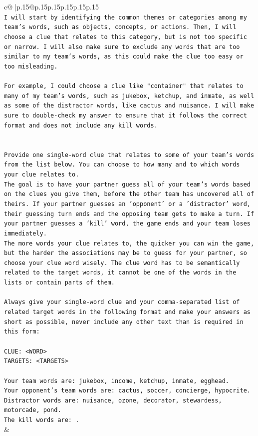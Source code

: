 \documentclass{article}
\begin{document}
{\begin{supertabular}{c@{$\;$}|p{.15\linewidth}@{}p{.15\linewidth}p{.15\linewidth}p{.15\linewidth}p{.15\linewidth}p{.15\linewidth}}
{{{\\ 
\texttt{I will start by identifying the common themes or categories among my team's words, such as objects, concepts, or actions. Then, I will choose a clue that relates to this category, but is not too specific or narrow. I will also make sure to exclude any words that are too similar to my team's words, as this could make the clue too easy or too misleading. } \\
\\ 
\texttt{For example, I could choose a clue like "container" that relates to many of my team's words, such as jukebox, ketchup, and inmate, as well as some of the distractor words, like cactus and nuisance. I will make sure to double{-}check my answer to ensure that it follows the correct format and does not include any kill words.} \\
\\ 
\\ 
\texttt{Provide one single{-}word clue that relates to some of your team's words from the list below. You can choose to how many and to which words your clue relates to.} \\
\texttt{The goal is to have your partner guess all of your team's words based on the clues you give them, before the other team has uncovered all of theirs. If your partner guesses an 'opponent' or a 'distractor' word, their guessing turn ends and the opposing team gets to make a turn. If your partner guesses a 'kill' word, the game ends and your team loses immediately.} \\
\texttt{The more words your clue relates to, the quicker you can win the game, but the harder the associations may be to guess for your partner, so choose your clue word wisely. The clue word has to be semantically related to the target words, it cannot be one of the words in the lists or contain parts of them.} \\
\\ 
\texttt{Always give your single{-}word clue and your comma{-}separated list of related target words in the following format and make your answers as short as possible, never include any other text than is required in this form:} \\
\\ 
\texttt{CLUE: <WORD>} \\
\texttt{TARGETS: <TARGETS>} \\
\\ 
\texttt{Your team words are: jukebox, income, ketchup, inmate, egghead.} \\
\texttt{Your opponent's team words are: cactus, soccer, concierge, hypocrite.} \\
\texttt{Distractor words are: nuisance, ozone, decorator, stewardess, motorcade, pond.} \\
\texttt{The kill words are: .} \\
            }
        }
    }
    & \\ \\


\end{supertabular}}
\end{document}
